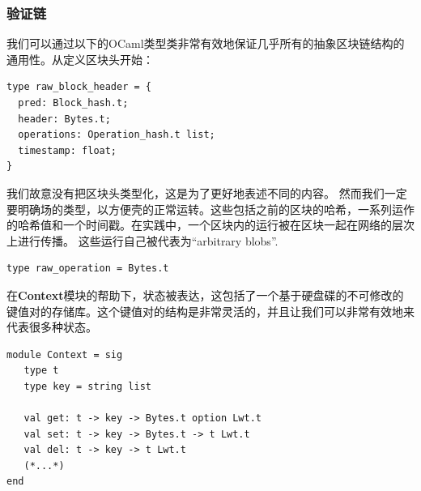 \documentclass[letterpaper]{article}
\begin{document}
\subsubsection{验证链}

我们可以通过以下的OCaml类型类非常有效地保证几乎所有的抽象区块链结构的通用性。从定义区块头开始：
\lstset{
  language=[Objective]Caml
}
\begin{lstlisting}
type raw_block_header = {
  pred: Block_hash.t;
  header: Bytes.t;
  operations: Operation_hash.t list;
  timestamp: float;
}
\end{lstlisting}

我们故意没有把区块头类型化，这是为了更好地表述不同的内容。
然而我们一定要明确场的类型，以方便壳的正常运转。这些包括之前的区块的哈希，一系列运作的哈希值和一个时间戳。在实践中，一个区块内的运行被在区块一起在网络的层次上进行传播。
这些运行自己被代表为“arbitrary blobs”.


\begin{lstlisting}
type raw_operation = Bytes.t
\end{lstlisting}

在\textbf{Context}模块的帮助下，状态被表达，这包括了一个基于硬盘碟的不可修改的键值对的存储库。这个键值对的结构是非常灵活的，并且让我们可以非常有效地来代表很多种状态。

\begin{lstlisting}
module Context = sig
   type t
   type key = string list

   val get: t -> key -> Bytes.t option Lwt.t
   val set: t -> key -> Bytes.t -> t Lwt.t
   val del: t -> key -> t Lwt.t
   (*...*)
end
\end{lstlisting}
\end{document}
